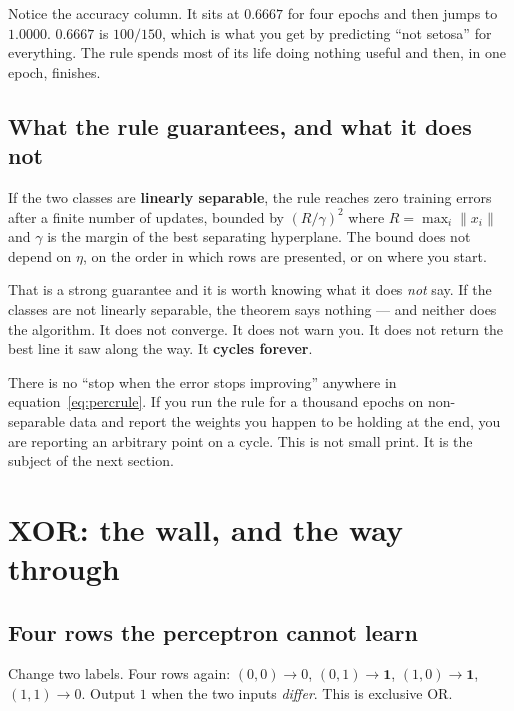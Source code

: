 \documentclass[11pt]{article}
\begin{document}
Notice the accuracy column. It sits at $0.6667$ for four epochs and then jumps
to $1.0000$. $0.6667$ is $100/150$, which is what you get by predicting
``not setosa'' for everything. The rule spends most of its life doing nothing
useful and then, in one epoch, finishes.

\subsection{What the rule guarantees, and what it does not}

\begin{keyidea}
If the two classes are \textbf{linearly separable}, the rule reaches zero
training errors after a finite number of updates, bounded by $(R/\gamma)^2$
where $R = \max_i \|x_i\|$ and $\gamma$ is the margin of the best separating
hyperplane. The bound does not depend on $\eta$, on the order in which rows
are presented, or on where you start.
\end{keyidea}

That is a strong guarantee and it is worth knowing what it does \emph{not}
say. If the classes are not linearly separable, the theorem says nothing --- and
neither does the algorithm. It does not converge. It does not warn you. It
does not return the best line it saw along the way. It \textbf{cycles
forever}.

\begin{caution}
There is no ``stop when the error stops improving'' anywhere in
equation~\eqref{eq:percrule}. If you run the rule for a thousand epochs on
non-separable data and report the weights you happen to be holding at the end,
you are reporting an arbitrary point on a cycle. This is not small print. It
is the subject of the next section.
\end{caution}

\section{XOR: the wall, and the way through}
\label{sec:xor}

\subsection{Four rows the perceptron cannot learn}

Change two labels. Four rows again: $(0,0)\to 0$, $(0,1)\to \mathbf{1}$,
$(1,0)\to \mathbf{1}$, $(1,1)\to 0$. Output $1$ when the two inputs
\emph{differ}. This is exclusive OR.
\end{document}
